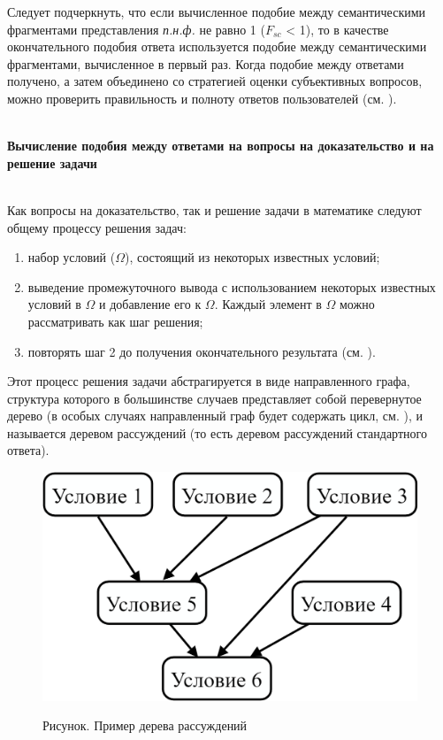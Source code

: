 Следует подчеркнуть, что если вычисленное подобие между семантическими фрагментами представления \textit{п.н.ф.} не равно 1 ($F_{sc}$ < 1), то в качестве окончательного подобия ответа используется подобие между семантическими фрагментами, вычисленное в первый раз. Когда подобие между ответами получено, а затем объединено со стратегией оценки субъективных вопросов, можно проверить правильность и полноту ответов пользователей (см. ).

~\\
\textbf{Вычисление подобия между ответами на вопросы на доказательство и на решение задачи} 

~\\
Как вопросы на доказательство, так и решение задачи в математике следуют общему процессу решения задач:

\begin{enumerate}
	\item набор условий ($\Omega $), состоящий из некоторых известных условий;
	
	\item выведение промежуточного вывода с использованием некоторых известных условий в $\Omega $ и добавление его к $\Omega $. Каждый элемент в $\Omega $ можно рассматривать как шаг решения;
	
	\item повторять шаг 2 до получения окончательного результата (см. ).
\end{enumerate}

Этот процесс решения задачи абстрагируется в виде направленного графа, структура которого в большинстве случаев представляет собой перевернутое дерево (в особых случаях направленный граф будет содержать цикл, см. \textit{}), и называется деревом рассуждений (то есть деревом рассуждений стандартного ответа).

\begin{figure}[H]
	\caption{Рисунок. Пример дерева рассуждений}
	\includegraphics[scale=0.15]{author/part7/figures/reasoning_tree_example.png}
	\label{fig:RT_example}
\end{figure}

